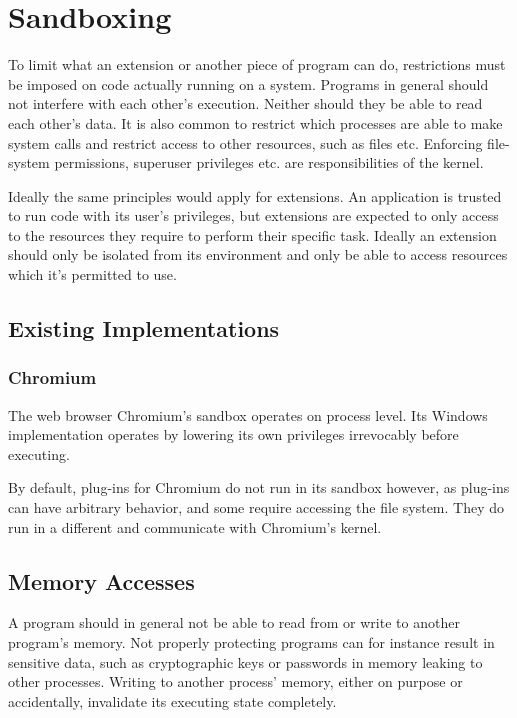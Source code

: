 \chapter {Sandboxing}

To limit what an extension or another piece of program can do, restrictions
must be imposed on code actually running on a system. Programs in general
should not interfere with each other's execution. Neither should they be able
to read each other's data. It is also common to restrict which processes are
able to make system calls and restrict access to other resources, such as files
etc. Enforcing file-system permissions, superuser privileges etc. are
responsibilities of the kernel.

Ideally the same principles would apply for extensions. An application is
trusted to run code with its user's privileges, but extensions are expected to
only access to the resources they require to perform their specific task.
Ideally an extension should only be isolated from its environment and only be
able to access resources which it's permitted to use.

\section {Existing Implementations}

\subsection {Chromium}

The web browser Chromium's sandbox operates on process level. Its Windows
implementation operates by lowering its own privileges irrevocably before
executing.

By default, plug-ins for Chromium do not run in its sandbox however, as
plug-ins can have arbitrary behavior, and some require accessing the file
system. They do run in a different and communicate with Chromium's kernel.

\section {Memory Accesses}

A program should in general not be able to read from or write to another
program's memory. Not properly protecting programs can for instance result in
sensitive data, such as cryptographic keys or passwords in memory leaking to
other processes. Writing to another process' memory, either on purpose or
accidentally, invalidate its executing state completely.

